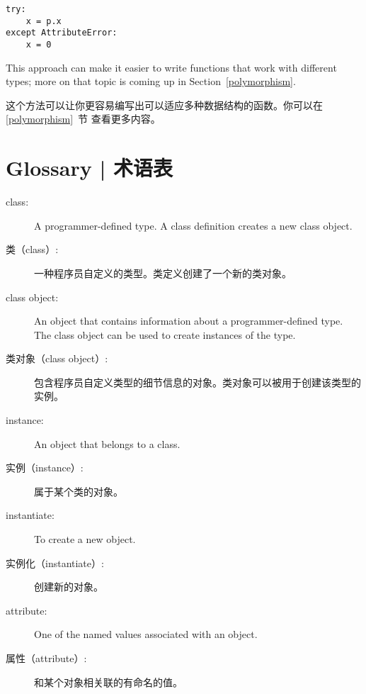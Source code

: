 \begin{lstlisting}
try:
    x = p.x
except AttributeError:
    x = 0
\end{lstlisting}

This approach can make it easier to write functions that work with
different types; more on that topic is
coming up in Section~\ref{polymorphism}.

这个方法可以让你更容易编写出可以适应多种数据结构的函数。你可以在 \ref{polymorphism}~节 查看更多内容。


\section{Glossary  |  术语表}

\begin{description}

\item[class:] A programmer-defined type.  A class definition creates a new
class object.

\item[类（class）:] 一种程序员自定义的类型。类定义创建了一个新的类对象。
    

\item[class object:] An object that contains information about a
programmer-defined type.  The class object can be used to create instances
of the type.

\item[类对象（class object）:]包含程序员自定义类型的细节信息的对象。类对象可以被用于创建该类型的实例。

  

\item[instance:] An object that belongs to a class.

\item[实例（instance）:] 属于某个类的对象。

\item[instantiate:] To create a new object.

\item[实例化（instantiate）:] 创建新的对象。

\item[attribute:] One of the named values associated with an object.

\item[属性（attribute）:] 和某个对象相关联的有命名的值。
  


\end{description}
